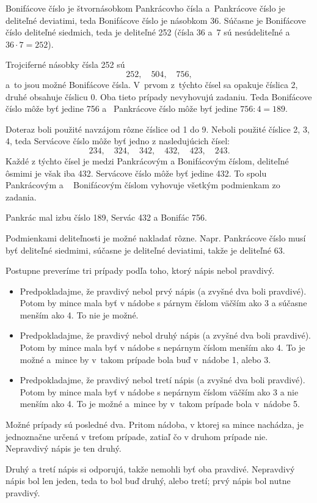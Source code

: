 {%
Bonifácove číslo je štvornásobkom Pankrácovho čísla
a~Pankrácove číslo je deliteľné deviatimi, teda Bonifácove číslo je násobkom 36.
Súčasne je Bonifácove číslo deliteľné siedmich, teda je deliteľné 252 (čísla 36 a~7 sú nesúdeliteľné a~$36\cdot7=252$).

Trojciferné násobky čísla 252 sú
$$
252,\quad 504,\quad 756,
$$
a~to jsou možné Bonifácove čísla.
V~prvom z~týchto čísel sa opakuje číslica 2, druhé obsahuje číslicu 0.
Oba tieto prípady nevyhovujú zadaniu.
Teda Bonifácove číslo môže byť jedine 756 a ~Pankrácove číslo môže byť jedine $756:4=189$.

Doteraz
boli použité navzájom rôzne číslice od 1 do 9.
Neboli použité číslice 2, 3, 4, teda Servácove číslo môže byť jedno z nasledujúcich čísel:
$$
234,\quad 324,\quad 342,\quad 432,\quad 423,\quad 243.
$$
Každé z týchto čísel je medzi Pankrácovým a Bonifácovým číslom, deliteľné ôsmimi je však iba 432.
Servácove číslo môže byť jedine 432.
To spolu Pankrácovým a ~ Bonifácovým číslom vyhovuje všetkým podmienkam zo zadania.

Pankrác mal izbu číslo 189, Servác 432 a Bonifác 756.

\poznamka
Podmienkami deliteľnosti je možné nakladať rôzne.
Napr. Pankrácove číslo musí byť deliteľné siedmimi, súčasne je deliteľné deviatimi, takže je deliteľné 63.
}

{%
Postupne preveríme tri prípady podľa toho, ktorý nápis nebol pravdivý.
\begin{itemize}
  \item Predpokladajme, že pravdivý nebol prvý nápis (a zvyšné dva boli pravdivé).
  Potom by mince mala byť v nádobe s párnym číslom väčším ako 3 a súčasne menším ako 4.
  To nie je možné.
  \item Predpokladajme, že pravdivý nebol druhý nápis (a zvyšné dva boli pravdivé).
  Potom by mince mala byť v nádobe s nepárnym číslom menším ako 4.
  To je možné a~mince by v~takom prípade bola buď v~nádobe 1, alebo 3.
  \item Predpokladajme, že pravdivý nebol tretí nápis (a zvyšné dva boli pravdivé).
  Potom by mince mala byť v nádobe s nepárnym číslom väčším ako 3 a nie menším ako 4.
  To je možné a~mince by v~takom prípade bola v~nádobe 5.
\end{itemize}

Možné prípady sú posledné dva.
Pritom nádoba, v ktorej sa mince nachádza, je jednoznačne určená v treťom prípade, zatiaľ čo v druhom prípade nie.
Nepravdivý nápis je ten druhý.

\poznamka
Druhý a tretí nápis si odporujú, takže nemohli byť oba pravdivé.
Nepravdivý nápis bol len jeden, teda to bol buď druhý, alebo tretí; prvý nápis bol nutne pravdivý.
}


